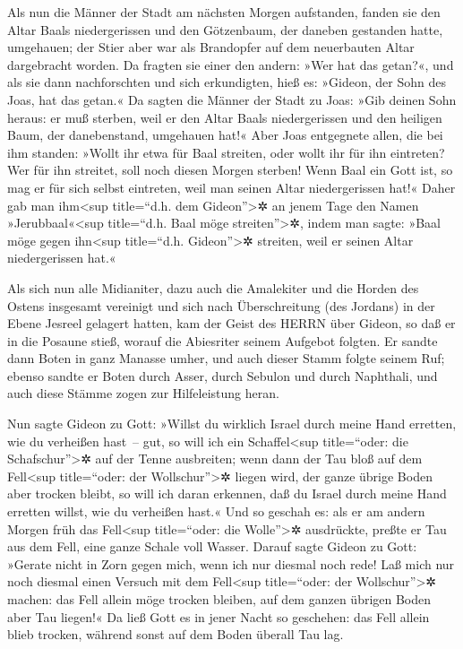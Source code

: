 Als nun die Männer der Stadt am nächsten Morgen
aufstanden, fanden sie den Altar Baals niedergerissen und den
Götzenbaum, der daneben gestanden hatte, umgehauen; der Stier aber war
als Brandopfer auf dem neuerbauten Altar dargebracht worden.
Da fragten sie einer den andern: »Wer hat das getan?«,
und als sie dann nachforschten und sich erkundigten, hieß es: »Gideon,
der Sohn des Joas, hat das getan.« Da sagten die Männer
der Stadt zu Joas: »Gib deinen Sohn heraus: er muß sterben, weil er den
Altar Baals niedergerissen und den heiligen Baum, der danebenstand,
umgehauen hat!« Aber Joas entgegnete allen, die bei ihm
standen: »Wollt ihr etwa für Baal streiten, oder wollt ihr für ihn
eintreten? Wer für ihn streitet, soll noch diesen Morgen sterben! Wenn
Baal ein Gott ist, so mag er für sich selbst eintreten, weil man seinen
Altar niedergerissen hat!« Daher gab man ihm\textless sup
title=``d.h. dem Gideon''\textgreater✲ an jenem Tage den Namen
»Jerubbaal«\textless sup title=``d.h. Baal möge streiten''\textgreater✲,
indem man sagte: »Baal möge gegen ihn\textless sup title=``d.h.
Gideon''\textgreater✲ streiten, weil er seinen Altar niedergerissen
hat.«

Als sich nun alle Midianiter, dazu auch die Amalekiter
und die Horden des Ostens insgesamt vereinigt und sich nach
Überschreitung (des Jordans) in der Ebene Jesreel gelagert hatten,
kam der Geist des HERRN über Gideon, so daß er in die
Posaune stieß, worauf die Abiesriter seinem Aufgebot folgten.
Er sandte dann Boten in ganz Manasse umher, und auch
dieser Stamm folgte seinem Ruf; ebenso sandte er Boten durch Asser,
durch Sebulon und durch Naphthali, und auch diese Stämme zogen zur
Hilfeleistung heran.

Nun sagte Gideon zu Gott: »Willst du wirklich Israel
durch meine Hand erretten, wie du verheißen hast~-- gut,
so will ich ein Schaffel\textless sup title=``oder: die
Schafschur''\textgreater✲ auf der Tenne ausbreiten; wenn dann der Tau
bloß auf dem Fell\textless sup title=``oder: der
Wollschur''\textgreater✲ liegen wird, der ganze übrige Boden aber
trocken bleibt, so will ich daran erkennen, daß du Israel durch meine
Hand erretten willst, wie du verheißen hast.« Und so
geschah es: als er am andern Morgen früh das Fell\textless sup
title=``oder: die Wolle''\textgreater✲ ausdrückte, preßte er Tau aus dem
Fell, eine ganze Schale voll Wasser. Darauf sagte Gideon
zu Gott: »Gerate nicht in Zorn gegen mich, wenn ich nur diesmal noch
rede! Laß mich nur noch diesmal einen Versuch mit dem Fell\textless sup
title=``oder: der Wollschur''\textgreater✲ machen: das Fell allein möge
trocken bleiben, auf dem ganzen übrigen Boden aber Tau liegen!«
Da ließ Gott es in jener Nacht so geschehen: das Fell
allein blieb trocken, während sonst auf dem Boden überall Tau lag.

